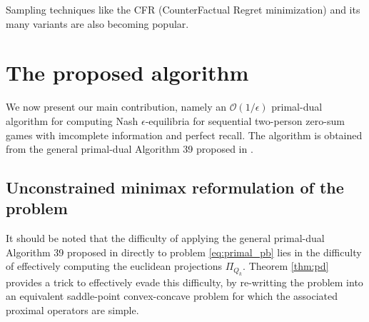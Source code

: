 \documentclass[12pt]{article}
\begin{document}
Sampling techniques like the CFR (CounterFactual Regret minimization) and its many variants \cite{MartinZinkevichNIPS2007, lanctot2009monte, Bowling09012015} are also becoming popular.

\section{The proposed algorithm}
\label{sec:algo}
We now present our main contribution, namely an $\mathcal{O}(1/\epsilon)$ primal-dual algorithm for computing Nash $\epsilon$-equilibria for sequential two-person zero-sum games with imcomplete information and perfect recall. The algorithm is obtained from the general primal-dual Algorithm 39 proposed in \cite{chambolle2010}.

\subsection{Unconstrained minimax reformulation of the problem}
It should be noted that the difficulty of applying the general primal-dual Algorithm 39 proposed in \cite{chambolle2010} directly to problem \eqref{eq:primal_pb} lies in the difficulty of effectively computing the euclidean projections $\Pi_{Q_k}$. Theorem \ref{thm:pd} provides a trick to effectively evade this difficulty, by re-writting the problem into an equivalent saddle-point convex-concave problem for which the associated proximal operators are simple.
\end{document}
